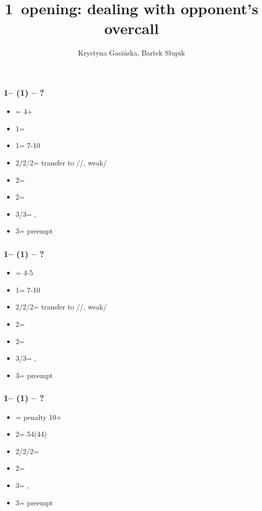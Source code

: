 \documentclass[12pt, a4paper]{article}
\title{1\diams\ opening: dealing with opponent's overcall}
\author{Krystyna Gasińska, Bartek Słupik}
\begin{document}
\maketitle


\subsubsection*{1\diams -- (1\hearts) -- ?}
\begin{itemize}
    \item \dbl = 4+\spades
    \item 1\spades = \nt
    \item 1\nt = 7-10
    \item 2\clubs/2\hearts/2\spades = transfer to \diams/\spades/\clubs, weak/\gf
    \item 2\diams = \diams\ \inv
    \item 2\nt = \inv
    \item 3\clubs/3\spades = \nat, \inv
    \item 3\diams = preempt
\end{itemize}

\subsubsection*{1\diams -- (1\spades) -- ?}
\begin{itemize}
    \item \dbl = 4-5\hearts
    \item 1\nt = 7-10
    \item 2\clubs/2\diams/2\spades = transfer to \diams/\hearts/\clubs, weak/\gf
    \item 2\hearts = \diams\ \inv
    \item 2\nt = \inv
    \item 3\clubs/3\hearts = \nat, \inv
    \item 3\diams = preempt
\end{itemize}

\subsubsection*{1\diams -- (1\nt) -- ?}
\begin{itemize}
    \item \dbl = penalty 10+
    \item 2\clubs = 54\major (44)
    \item 2\diams/2\hearts/2\spades = \nf
    \item 2\nt = \inv\ \diams
    \item 3\anysuit = \nat, \inv\ \unbal
    \item 3\diams = preempt
\end{itemize}
\end{document}
